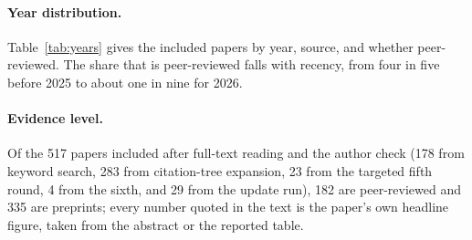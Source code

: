 \paragraph{Year distribution.}
Table~\ref{tab:years} gives the included papers by year, source, and whether peer-reviewed. The share that is peer-reviewed falls with recency, from four in five before 2025 to about one in nine for 2026.

\begin{table}[h]
\nattab[\footnotesize]
\setlength{\tabcolsep}{3pt}
\bcap
\label{tab:years}
\end{table}

\paragraph{Evidence level.}
Of the 517 papers included after full-text reading and the author check (178 from keyword search, 283 from citation-tree expansion, 23 from the targeted fifth round, 4 from the sixth, and 29 from the update run), 182 are peer-reviewed and 335 are preprints; every number quoted in the text is the paper's own headline figure, taken from the abstract or the reported table.

